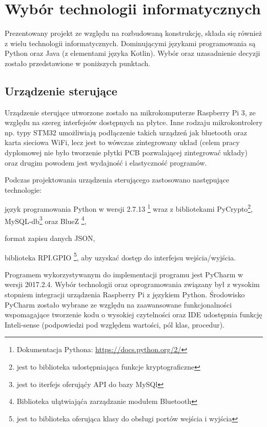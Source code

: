\newpage\section{Wybór technologii informatycznych} \label{sec:technologie}
Prezentowany projekt ze względu na rozbudowaną konstrukcję, składa się również z wielu technologii informatycznych. Dominującymi językami programowania są Python oraz Java (z elementami języka Kotlin). Wybór oraz uzasadnienie decyzji zostało przedstawione w poniższych punktach.

\subsection{Urządzenie sterujące}
Urządzenie sterujące utworzone zostało na mikrokomputerze Raspberry Pi 3, ze względu na szereg interfejsów dostępnych na płytce. Inne rodzaju mikrokontrolery np. typy STM32 umożliwiają podłączenie takich urządzeń jak bluetooth oraz karta sieciowa WiFi, lecz jest to wówczas zintegrowany układ (celem pracy dyplomowej nie było tworzenie płytki PCB pozwalającej zintegrować układy) oraz drugim powodem jest wydajność i elastyczność programów. 

Podczas projektowania urządzenia sterującego zastosowano następujące technologie:
\begin{itemize*}
	\item język programowania Python w wersji 2.7.13 \footnote{ Dokumentacja Pythona: \href {https://docs.python.org/2/}{https://docs.python.org/2/}} wraz z bibliotekami PyCrypto\footnote{ jest to biblioteka udostępniająca funkcje kryptograficzne}, MySQL-db\footnote{ jest to iterfejs oferująćy API do bazy MySQl  } oraz BlueZ \footnote{Biblioteka ułątwiająća zarządzanie modułem Bluetooth  },
	\item format zapisu danych JSON,
	\item biblioteka RPI.GPIO
	 \footnote{ jest to biblioteka oferująca klasy do obsługi portów  wejścia i wyjścia}, aby uzyskać dostęp do interfejsu wejścia/wyjścia.
\end{itemize*}

Programem wykorzystywanym do implementacji programu jest PyCharm w wersji 2017.2.4. Wybór technologii oraz oprogramowania związany był z wysokim stopniem integracji urządzenia Raspberry Pi z językiem Python. Środowisko PyCharm zostało wybrane ze względu na zaawansowane funkcjonalności wspomagające tworzenie kodu o wysokiej czytelności oraz IDE udostępnia funkcję Inteli-sense (podpowiedzi pod względem wartości, pól klas, procedur).

